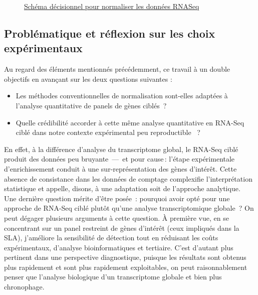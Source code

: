 \begin{figure}[H]
{
}
\caption{\underline{Schéma décisionnel pour normaliser les données RNASeq}}
\label{fig:biaisNORMALISATION}
\end{figure}

\subsection{Problématique et réflexion sur les choix expérimentaux}
Au regard des éléments mentionnés précédemment, ce travail à un double objectifs  en avançant sur les deux questions suivantes :
\begin{itemize}
  \item Les méthodes conventionnelles de normalisation sont-elles adaptées à l’analyse quantitative de panels de gènes ciblés~?
  \item Quelle crédibilité accorder à cette même analyse quantitative en RNA-Seq ciblé dans notre contexte expérimental peu reproductible ~?
\end{itemize}

En effet, à la différence d'analyse du transcriptome global, le RNA-Seq ciblé produit des données peu bruyante~—~et pour cause : l’étape expérimentale d’enrichissement conduit à une sur-représentation des gènes d’intérêt. Cette absence de \og consistance \fg dans les données de comptage complexifie l’interprétation statistique et appelle, disons, à une adaptation soit de l'approche analytique. \\
 
Une dernière question mérite d’être posée~:  pourquoi avoir opté pour une approche de RNA-Seq ciblé plutôt qu’une analyse transcriptomique globale~?  
On peut dégager plusieurs arguments à cette question. À première vue, en se concentrant sur un panel restreint de gènes d’intérêt (ceux impliqués dans la SLA), j’améliore la sensibilité de détection tout en réduisant les coûts expérimentaux, d'analyse bioinformatiques et tertiaire. C’est d’autant plus pertinent dans une perspective diagnostique, puisque les résultats sont obtenus plus rapidement et sont plus rapidement exploitables, on peut raisonnablement penser que l'analyse biologique d'un transcriptome globale et bien plus chronophage.\\

